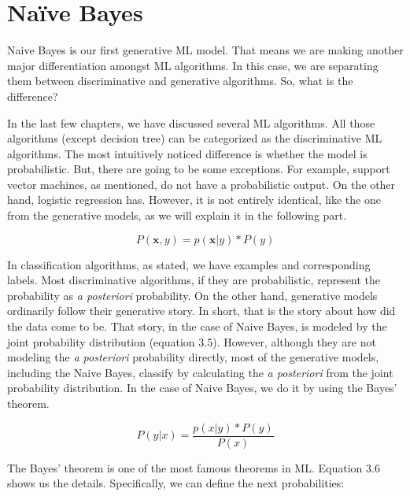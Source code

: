\documentclass[times, utf8, seminar]{fer}
\begin{document}
\newpage

\section{Naïve Bayes}

Naive Bayes is our first generative ML model. That means we are making another major differentiation amongst ML algorithms. In this case, we are separating them between discriminative and generative algorithms. So, what is the difference? 

In the last few chapters, we have discussed several ML algorithms. All those algorithms (except decision tree) can be categorized as the discriminative ML algorithms. The most intuitively noticed difference is whether the model is probabilistic. But, there are going to be some exceptions. For example, support vector machines, as mentioned, do not have a probabilistic output. On the other hand, logistic regression has. However, it is not entirely identical, like the one from the generative models, as we will explain it in the following part.

\begin{equation}
P(\textbf{x},y) = p(\textbf{x}|y)*P(y) 
\end{equation} \newline

In classification algorithms, as stated, we have examples and corresponding labels. Most discriminative algorithms, if they are probabilistic, represent the probability as \textit{a posteriori} probability. On the other hand, generative models ordinarily follow their generative story. In short, that is the story about how did the data come to be. That story, in the case of Naive Bayes, is modeled by the joint probability distribution (equation 3.5). However, although they are not modeling the \textit{a posteriori} probability directly, most of the generative models, including the Naive Bayes, classify by calculating the \textit{a posteriori} from the joint probability distribution. In the case of Naive Bayes, we do it by using the Bayes' theorem.


\begin{equation}
P(y|x) = \frac{p(x|y)*P(y)}{P(x)}
\end{equation} \newline


The Bayes' theorem is one of the most famous theorems in ML.  Equation 3.6 shows us the details. Specifically, we can define the next probabilities: 
\end{document}
